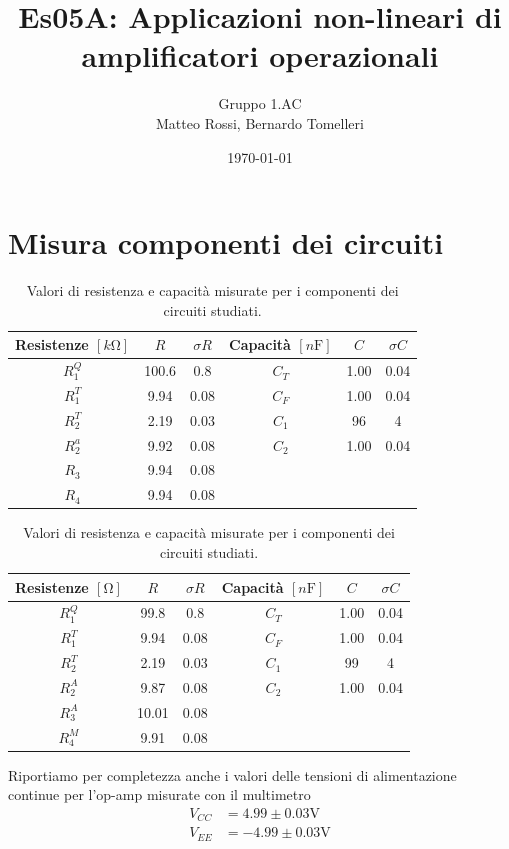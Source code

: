 \documentclass[10pt, a4paper, italian]{article}
\author{Gruppo 1.AC \\ Matteo Rossi, Bernardo Tomelleri}
\title{Es05A: Applicazioni non-lineari di amplificatori operazionali}
\begin{document}
\date{\today}
\maketitle

\setcounter{section}{0}

\section*{Misura componenti dei circuiti}
\begin{table}[htbp]
\centering
\begin{tabular}{cccccc}
\toprule
Resistenze $[\si{k\ohm}]$ & $R$ & $\sigma R$ & Capacità $[\si{n\F}]$ & $C$ &
$\sigma C$ \\
\midrule
\midrule
$R_1^Q$	  & 100.6 	& 0.8 	 & $C_T$ & 1.00		 & 0.04 \\
$R_1^T$	  & 9.94	& 0.08 	 & $C_F$ & 1.00		 & 0.04 \\
$R_2^T$	  & 2.19	& 0.03	 & $C_1$ & 96		 & 4	\\
$R_2^a$	  & 9.92	& 0.08	 & $C_2$ & 1.00		 & 0.04 \\
$R_3$	  & 9.94	& 0.08	 & & & \\
$R_4$	  & 9.94	& 0.08	 & & & \\
\bottomrule     
\end{tabular}
\caption{Valori di resistenza e capacità misurate per i componenti dei
circuiti studiati. \label{tab: rcmes_B}}

\begin{tabular}{cccccc}
\toprule
Resistenze $[\si{\ohm}]$ & $R$ & $\sigma R$ & Capacità $[\si{n\F}]$ & $C$ &
$\sigma C$ \\
\midrule
\midrule
$R_1^Q$	  & 99.8 	& 0.8 	 & $C_T$ & 1.00		 & 0.04 \\
$R_1^T$	  & 9.94	& 0.08 	 & $C_F$ & 1.00		 & 0.04 \\
$R_2^T$	  & 2.19	& 0.03	 & $C_1$ & 99		 & 4	\\
$R_2^A$	  & 9.87		& 0.08		 & $C_2$ & 1.00		 & 0.04 \\
$R_3^A$	  & 10.01		& 0.08		 & & & \\
$R_4^M$	  & 9.91		& 0.08		 & & & \\
\bottomrule     
\end{tabular}
\caption{Valori di resistenza e capacità misurate per i componenti dei
circuiti studiati. \label{tab: rcmes_M}}
\end{table}

Riportiamo per completezza anche i valori delle tensioni di alimentazione
continue per l'op-amp misurate con il multimetro
\begin{align*}
V_{CC} &= 4.99 \pm 0.03 \si{\V} \\
V_{EE} &= -4.99 \pm 0.03 \si{\V}
\end{align*}
\end{document}
